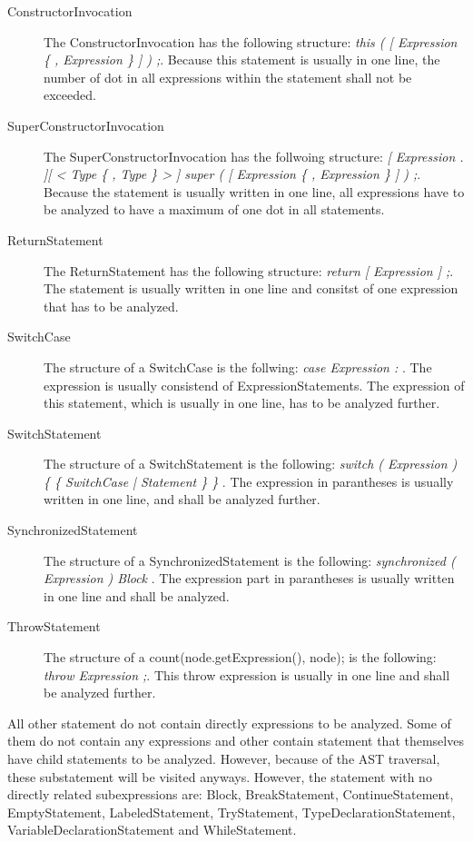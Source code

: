 \begin{description}
  \item[ConstructorInvocation] The ConstructorInvocation has the following structure: \textit{this ( [ Expression \{ , Expression \} ] ) ;}. Because this statement is usually in one line, the number of dot in all expressions within the statement shall not be exceeded.
  \item[SuperConstructorInvocation] The SuperConstructorInvocation has the follwoing structure: \textit{[ Expression . ][ < Type \{ , Type \} > ] super ( [ Expression \{ , Expression \} ] ) ;}. Because the statement is usually written in one line, all expressions have to be analyzed to have a maximum of one dot in all statements.
  \item[ReturnStatement] The ReturnStatement has the following structure: \textit{return [ Expression ] ;}. The statement is usually written in one line and consitst of one expression that has to be analyzed.
  \item[SwitchCase] The structure of a SwitchCase is the follwing: \textit{ case Expression  : }. The expression is usually consistend of ExpressionStatements. The expression of this statement, which is usually in one line, has to be analyzed further.
  \item[SwitchStatement] The structure of a SwitchStatement is the following: \textit{ switch ( Expression ) \{ \{ SwitchCase | Statement \} \} }. The expression in parantheses is usually written in one line, and shall be analyzed further. 
  \item[SynchronizedStatement] The structure of a SynchronizedStatement is the following: \textit{  synchronized ( Expression ) Block }. The expression part in parantheses is usually written in one line and shall be analyzed.
  \item[ThrowStatement] The structure of a count(node.getExpression(), node); is the following: \textit{throw Expression ;}. This throw expression is usually in one line and shall be analyzed further.
\end{description}

All other statement do not contain directly expressions to be analyzed. Some of them do not contain any expressions and other contain statement that themselves have child statements to be analyzed. However, because of the \acf{AST} traversal, these substatement will be visited anyways. However, the statement with no directly related subexpressions are: Block, BreakStatement, ContinueStatement, EmptyStatement, LabeledStatement, TryStatement, TypeDeclarationStatement, VariableDeclarationStatement and WhileStatement.
\\

